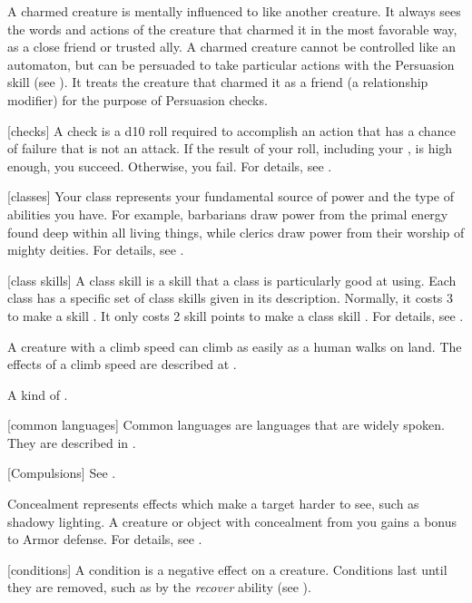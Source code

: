  A charmed creature is mentally influenced to like another creature.
It always sees the words and actions of the creature that charmed it in the most favorable way, as a close friend or trusted ally.
A charmed creature cannot be controlled like an automaton, but can be persuaded to take particular actions with the Persuasion skill (see ).
It treats the creature that charmed it as a friend (a  relationship modifier) for the purpose of Persuasion checks.

[checks] A check is a d10 roll required to accomplish an action that has a chance of failure that is not an attack.
If the result of your roll, including your , is high enough, you succeed.
Otherwise, you fail.
For details, see .

[classes] Your class represents your fundamental source of power and the type of abilities you have.
For example, barbarians draw power from the primal energy found deep within all living things, while clerics draw power from their worship of mighty deities.
For details, see .

[class skills] A class skill is a skill that a class is particularly good at using.
Each class has a specific set of class skills given in its description.
Normally, it costs 3  to make a skill .
It only costs 2 skill points to make a class skill .
For details, see .

 A creature with a climb speed can climb as easily as a human walks on land.
The effects of a climb speed are described at .

 A kind of .

[common languages] Common languages are languages that are widely spoken.
They are described in .

[Compulsions] See .

 Concealment represents effects which make a target harder to see, such as shadowy lighting.
A creature or object with concealment from you gains a  bonus to Armor defense.
For details, see .

[conditions] A condition is a negative effect on a creature.
Conditions last until they are removed, such as by the \textit{recover} ability (see ).

